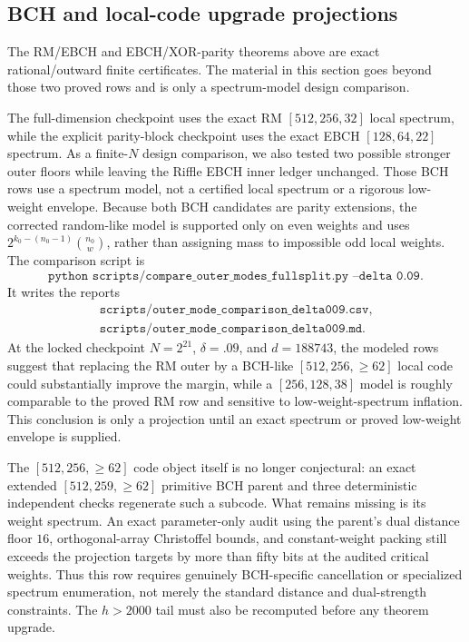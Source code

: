 \subsection{BCH and local-code upgrade projections}
\label{sec:local-code-projections}

The RM/EBCH and EBCH/XOR-parity theorems above are exact rational/outward
finite certificates.  The material in this section goes beyond those two
proved rows and is only a spectrum-model design comparison.

The full-dimension checkpoint uses the exact RM \([512,256,32]\) local
spectrum, while the explicit parity-block checkpoint uses the exact EBCH
\([128,64,22]\) spectrum.  As a finite-\(N\) design comparison, we also tested
two possible stronger outer floors while leaving the Riffle EBCH inner
ledger unchanged.  Those BCH rows use a spectrum model, not a certified local
spectrum or a rigorous low-weight envelope.
Because both BCH candidates are parity extensions, the corrected random-like
model is supported only on even weights and uses
\(2^{k_0-(n_0-1)}\binom{n_0}{w}\), rather than assigning mass to impossible
odd local weights.
The comparison script is
\[
\texttt{python scripts/compare\_outer\_modes\_fullsplit.py --delta 0.09}.
\]
It writes the reports
\[
\begin{gathered}
\texttt{scripts/outer\_mode\_comparison\_delta009.csv},\\
\texttt{scripts/outer\_mode\_comparison\_delta009.md}.
\end{gathered}
\]
At the locked checkpoint \(N=2^{21}\), \(\delta=.09\), and \(d=188743\), the
modeled rows suggest that replacing the RM outer by a BCH-like
\([512,256,\ge62]\) local code could substantially improve the margin, while a
\([256,128,38]\) model is roughly comparable to the proved RM row and sensitive
to low-weight-spectrum inflation.  This conclusion is only a projection until
an exact spectrum or proved low-weight envelope is supplied.

The \([512,256,\ge62]\) code object itself is no longer conjectural: an exact
extended \([512,259,\ge62]\) primitive BCH parent and three deterministic
independent checks regenerate such a subcode.  What remains missing is its
weight spectrum.  An exact parameter-only audit using the parent's dual
distance floor \(16\), orthogonal-array Christoffel bounds, and constant-weight
packing still exceeds the projection targets by more than fifty bits at the
audited critical weights.  Thus this row requires genuinely BCH-specific
cancellation or specialized spectrum enumeration, not merely the standard
distance and dual-strength constraints.  The \(h>2000\) tail must also be
recomputed before any theorem upgrade.

